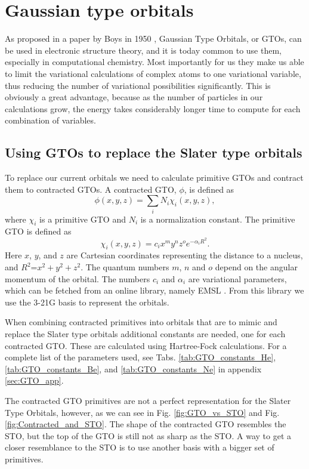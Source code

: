 \section{Gaussian type orbitals}

	As proposed in a paper by Boys in 1950 \cite{Boys_1950},
	Gaussian Type Orbitals, or GTOs, can be used in electronic structure
	theory, and it is today common to use them, especially in computational
	chemistry. Most importantly for us they make us able to limit the
	variational calculations of complex atoms to one variational variable,
	thus reducing the number of variational possibilities significantly.
	This is obviously a great advantage, because as the number of particles
	in our calculations grow, the energy takes considerably longer time
	to compute for each combination of variables. 


	\subsection{Using GTOs to replace the Slater type orbitals}

		To replace our current orbitals we need to calculate primitive GTOs
		and contract them to contracted GTOs. A contracted GTO, $\phi$,
		is defined as
		\[
		\phi\left(x,y,z\right)=\sum_{i}N_{i}\chi_{i}\left(x,y,z\right),
		\]
		where $\chi_{i}$ is a primitive GTO and $N_{i}$ is a normalization
		constant. The primitive GTO is defined as
		\[
		\chi_{i}\left(x,y,z\right)=c_{i}x^{m}y^{n}z^{o}e^{-\alpha_{i}R^{2}}.
		\]
		Here $x$, $y$, and $z$ are Cartesian coordinates representing the
		distance to a nucleus, and $R^{2}$=$x^{2}+y^{2}+z^{2}$. The quantum
		numbers $m$, $n$ and $o$ depend on the angular momentum of the
		orbital. The numbers $c_{i}$ and $\alpha_{i}$ are variational parameters,
		which can be fetched from an online library, namely EMSL \cite{Binkley_1980}\cite{EMSL}.
		From this library we use the 3-21G basis to represent the orbitals.

		When combining contracted primitives into orbitals that are to mimic
		and replace the Slater type orbitals additional constants are needed,
		one for each contracted GTO. These are calculated using Hartree-Fock
		calculations. For a complete list of the parameters used, see Tabs. \ref{tab:GTO_constants_He}, \ref{tab:GTO_constants_Be}, and \ref{tab:GTO_constants_Ne} in appendix \ref{sec:GTO_app}. 

		The contracted GTO primitives are not a perfect representation for the
		Slater Type Orbitals, however, as we can see in Fig. \ref{fig:GTO_vs_STO} 
		and Fig. \ref{fig:Contracted_and_STO}. The shape of the contracted GTO 
		resembles the STO, but the top of the GTO is still not as sharp as the STO.
		A way to get a closer resemblance to the STO is to use another basis with 
		a bigger set of primitives.

